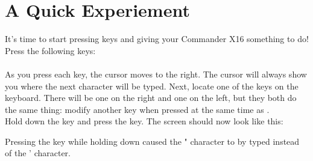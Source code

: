 \vspace{16pt}


\section{A Quick Experiement}


It's time to start pressing keys and giving your Commander X16 something to do!
Press the following keys:\\

    \\



As you press each key, the cursor moves to the right.  The cursor will always
show you where the next character will be typed.  Next, locate one of the
 keys on the keyboard.  There will be
one on the right and one on the left, but they both do the same thing: modify another
key when pressed at the same time as .\\

Hold down the  key and press the
 key.  The screen should now look
like this:\\


Pressing the  key while holding down
 caused the {\ttfamily "} character to
by typed instead of the {\ttfamily '} character.\\

